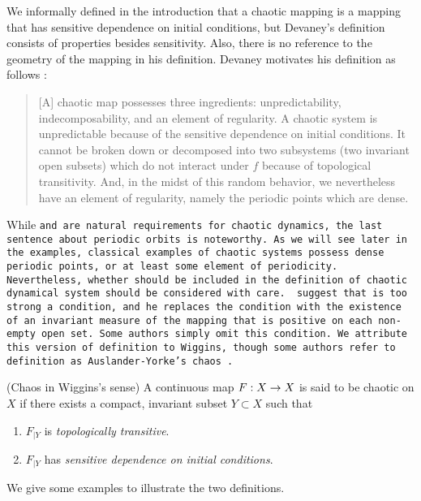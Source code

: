 \documentclass[10pt,draft,twoside]{book}
\begin{document}
We informally defined in the introduction that a chaotic mapping is a mapping that has sensitive dependence on initial conditions, but Devaney's definition consists of properties besides sensitivity.
Also, there is no reference to the geometry of the mapping in his definition.
Devaney motivates his definition as follows \citep[p.50]{devaney}:
\begin{quotation}
  [A] chaotic map possesses three ingredients:
  unpredictability, indecomposability, and an element of regularity.
  A chaotic system is unpredictable because of the sensitive dependence on initial conditions.
  It cannot be broken down or decomposed into two subsystems (two invariant open subsets) which do not interact under $f$ because of topological transitivity.
  And, in the midst of this random behavior, we nevertheless have an element of regularity, namely the periodic points which are dense.
\end{quotation}
While \tt and \sdic are natural requirements for chaotic dynamics, the last sentence about periodic orbits is noteworthy.
As we will see later in the examples, classical examples of chaotic systems possess dense periodic points, or at least some element of periodicity.
Nevertheless, whether \dpp should be included in the definition of chaotic dynamical system should be considered with care.
\citet{glasner} suggest that \dpp is too strong a condition, and he replaces the condition with the existence of an invariant measure of the mapping that is positive on each non-empty open set. 
Some authors simply omit this condition.
We attribute this version of definition to Wiggins, though some authors refer to definition as Auslander-Yorke's chaos \citep{blanchard}.
\begin{definition}
  (Chaos in Wiggins's sense)
  A continuous map $F: X\rightarrow X$ is said to be chaotic on $X$ if there exists a compact, invariant subset $Y \subset X$ such that
  \begin{enumerate}
    \item $F_{|Y}$ is \textit{topologically transitive}.
    \item $F_{|Y}$ has \textit{sensitive dependence on initial conditions}.
  \end{enumerate}
\end{definition}
We give some examples to illustrate the two definitions.
\end{document}
